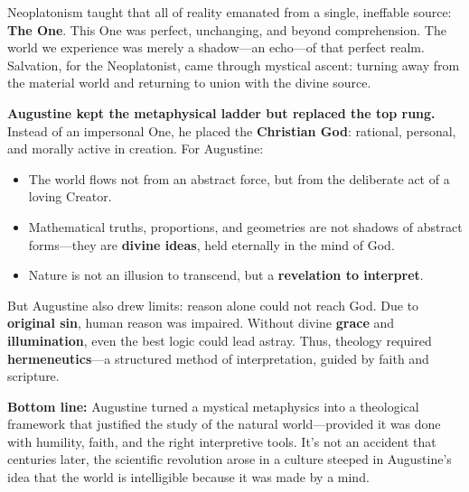 \begin{tcolorbox}[
    colback=blue!5!white,
    colframe=blue!75!black,
    title=Sidebar: From the One to the Word — Augustine’s Theological Upgrade of Neoplatonism,
    fonttitle=\bfseries,
    sharp corners,
    boxrule=0.7pt,
    breakable
  ]
  
  Neoplatonism taught that all of reality emanated from a single, ineffable source: \textbf{The One}. This One was perfect, unchanging, and beyond comprehension. The world we experience was merely a shadow—an echo—of that perfect realm. Salvation, for the Neoplatonist, came through mystical ascent: turning away from the material world and returning to union with the divine source.
  
  \medskip
  
  \textbf{Augustine kept the metaphysical ladder but replaced the top rung.} Instead of an impersonal One, he placed the \textbf{Christian God}: rational, personal, and morally active in creation. For Augustine:
  
  \begin{itemize}
      \item The world flows not from an abstract force, but from the deliberate act of a loving Creator.
      \item Mathematical truths, proportions, and geometries are not shadows of abstract forms—they are \textbf{divine ideas}, held eternally in the mind of God.
      \item Nature is not an illusion to transcend, but a \textbf{revelation to interpret}.
  \end{itemize}
  
  But Augustine also drew limits: reason alone could not reach God. Due to \textbf{original sin}, human reason was impaired. Without divine \textbf{grace} and \textbf{illumination}, even the best logic could lead astray. Thus, theology required \textbf{hermeneutics}—a structured method of interpretation, guided by faith and scripture.
  
  \medskip
  
  \textbf{Bottom line:} Augustine turned a mystical metaphysics into a theological framework that justified the study of the natural world—provided it was done with humility, faith, and the right interpretive tools. It’s not an accident that centuries later, the scientific revolution arose in a culture steeped in Augustine’s idea that the world is intelligible because it was made by a mind.
  
  \end{tcolorbox}


